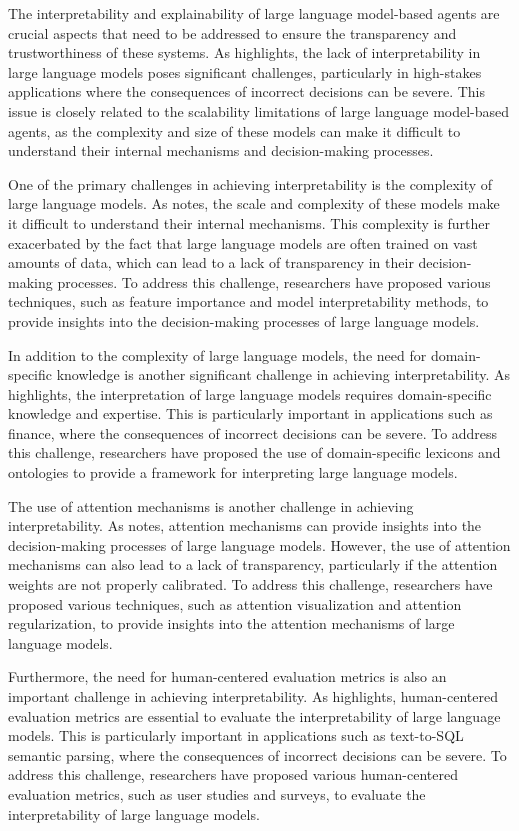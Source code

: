 \documentclass[11pt]{article}
\begin{document}
The interpretability and explainability of large language model-based agents are crucial aspects that need to be addressed to ensure the transparency and trustworthiness of these systems. As \cite{ref265} highlights, the lack of interpretability in large language models poses significant challenges, particularly in high-stakes applications where the consequences of incorrect decisions can be severe. This issue is closely related to the scalability limitations of large language model-based agents, as the complexity and size of these models can make it difficult to understand their internal mechanisms and decision-making processes.

One of the primary challenges in achieving interpretability is the complexity of large language models. As \cite{ref36} notes, the scale and complexity of these models make it difficult to understand their internal mechanisms. This complexity is further exacerbated by the fact that large language models are often trained on vast amounts of data, which can lead to a lack of transparency in their decision-making processes. To address this challenge, researchers have proposed various techniques, such as feature importance and model interpretability methods, to provide insights into the decision-making processes of large language models.

In addition to the complexity of large language models, the need for domain-specific knowledge is another significant challenge in achieving interpretability. As \cite{ref266} highlights, the interpretation of large language models requires domain-specific knowledge and expertise. This is particularly important in applications such as finance, where the consequences of incorrect decisions can be severe. To address this challenge, researchers have proposed the use of domain-specific lexicons and ontologies to provide a framework for interpreting large language models.

The use of attention mechanisms is another challenge in achieving interpretability. As \cite{ref267} notes, attention mechanisms can provide insights into the decision-making processes of large language models. However, the use of attention mechanisms can also lead to a lack of transparency, particularly if the attention weights are not properly calibrated. To address this challenge, researchers have proposed various techniques, such as attention visualization and attention regularization, to provide insights into the attention mechanisms of large language models.

Furthermore, the need for human-centered evaluation metrics is also an important challenge in achieving interpretability. As \cite{ref268} highlights, human-centered evaluation metrics are essential to evaluate the interpretability of large language models. This is particularly important in applications such as text-to-SQL semantic parsing, where the consequences of incorrect decisions can be severe. To address this challenge, researchers have proposed various human-centered evaluation metrics, such as user studies and surveys, to evaluate the interpretability of large language models.
\end{document}
